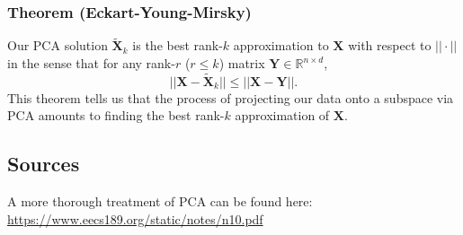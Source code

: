 \documentclass{article}
\begin{document}
\subsubsection*{Theorem (Eckart-Young-Mirsky)}
Our PCA solution $\widetilde{\textbf{X}}_k$ is the best rank-$k$ approximation to $\textbf{X}$ with respect to $||\cdot||$ in the sense that for any rank-$r$ ($r \leq k$) matrix $\textbf{Y} \in \mathbb{R}^{n \times d}$, 
\[
||\textbf{X} - \widetilde{\textbf{X}}_k|| \leq ||\textbf{X} - \textbf{Y}||.
\]
This theorem tells us that the process of projecting our data onto a subspace via PCA amounts to finding the best rank-$k$ approximation of $\textbf{X}$. 

\subsection*{Sources}
A more thorough treatment of PCA can be found here: \url{https://www.eecs189.org/static/notes/n10.pdf}
\end{document}
